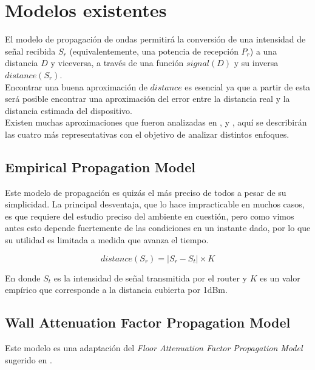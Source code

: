 \documentclass[journal]{IEEEtran}
\begin{document}
\section{Modelos existentes}

El modelo de propagación de ondas permitirá la conversión de una intensidad de señal recibida $S_r$ (equivalentemente, una potencia de recepción $P_r$) a una distancia $D$ y viceversa, a través de una función $signal(D)$ y su inversa $distance(S_r)$.\\

Encontrar una buena aproximación de $distance$ es esencial ya que a partir de esta será posible encontrar una aproximación del error entre la distancia real y la distancia estimada del dispositivo.\\

Existen muchas aproximaciones que fueron analizadas en \cite{low:cost:location:determination}, \cite{radar:tracking:system} y \cite{generic:model:signal:propagation}, aquí se describirán las cuatro más representativas con el objetivo de analizar distintos enfoques.\\

\subsection{Empirical Propagation Model}

Este modelo de propagación es quizás el más preciso de todos a pesar de su simplicidad. La principal desventaja, que lo hace impracticable en muchos casos, es que requiere del estudio preciso del ambiente en cuestión, pero como vimos antes esto depende fuertemente de las condiciones en un instante dado, por lo que su utilidad es limitada a medida que avanza el tiempo.

$$distance(S_r) = |S_r - S_t| \times K$$

En donde $S_t$ es la intensidad de señal transmitida por el router y $K$ es un valor empírico que corresponde a la distancia cubierta por 1dBm.\\

\subsection{Wall Attenuation Factor Propagation Model}

Este modelo es una adaptación del \emph{Floor Attenuation Factor Propagation Model} sugerido en \cite{path:loss:prediction:models}.\\
\end{document}
